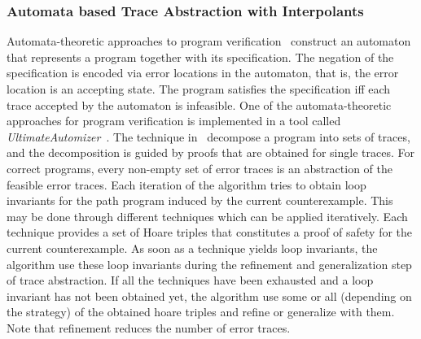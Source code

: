 \subsubsection{Automata based Trace Abstraction with Interpolants}
%
Automata-theoretic approaches to program verification~\cite{DBLP:conf/cav/KupfermanV00,
DBLP:books/sp/cstoday95/Vardi95,DBLP:conf/cav/HeizmannHP13} construct 
an automaton that represents a program together with its specification.
The negation of the specification is encoded via error locations in the automaton, 
that is, the error location is an accepting state.  The program satisfies the 
specification iff each trace accepted by the automaton is infeasible.
%
One of the automata-theoretic approaches for program verification 
is implemented in a tool called 
\textit{UltimateAutomizer}~\cite{DBLP:conf/tacas/HeizmannDGLMSP16}. 
The technique in~\cite{DBLP:conf/tacas/HeizmannDGLMSP16} decompose a 
program into sets of traces, and the decomposition is guided by proofs that 
are obtained for single traces. For correct programs, every non-empty set 
of error traces is an abstraction of the feasible error traces.  
Each iteration of the algorithm tries to obtain loop invariants for the path program
induced by the current counterexample.  This may be done through different techniques 
which can be applied iteratively. Each technique provides a set of Hoare triples that constitutes a proof of
safety for the current counterexample.
As soon as a technique yields loop invariants, the algorithm use these loop
invariants during the refinement and generalization step of trace abstraction.  If all the 
techniques have been exhausted and a loop invariant has not been obtained yet, the algorithm
use some or all (depending on the strategy) of the obtained hoare triples and 
refine or generalize with them.  Note that refinement reduces the number of error traces. 
